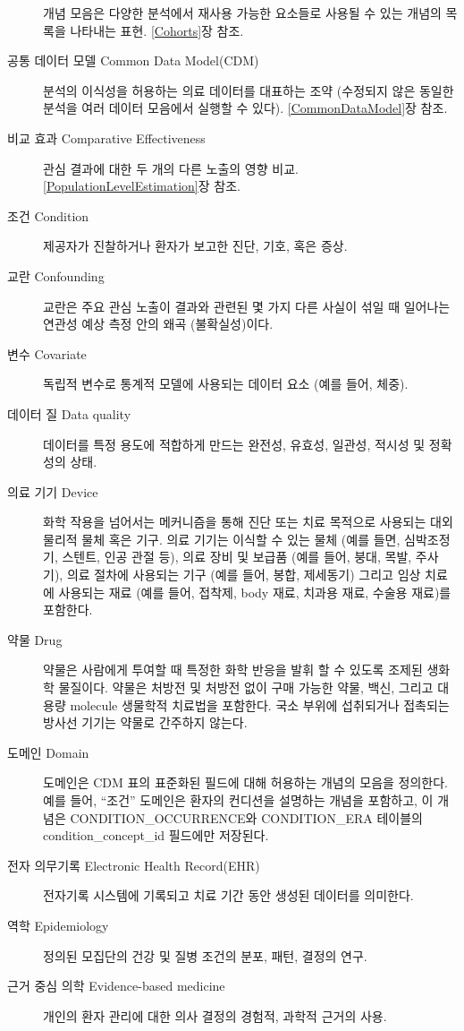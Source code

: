 \documentclass[10.5pt]{book}
\theoremstyle{definition}
\theoremstyle{definition}
\theoremstyle{definition}
\theoremstyle{remark}
\begin{document}
\begin{description}
개념 모음은 다양한 분석에서 재사용 가능한 요소들로 사용될 수 있는 개념의
목록을 나타내는 표현. \ref{Cohorts}장 참조.
\item[공통 데이터 모델 Common Data Model(CDM)]
분석의 이식성을 허용하는 의료 데이터를 대표하는 조약 (수정되지 않은
동일한 분석을 여러 데이터 모음에서 실행할 수 있다).
\ref{CommonDataModel}장 참조.
\item[비교 효과 Comparative Effectiveness]
관심 결과에 대한 두 개의 다른 노출의 영향 비교.
\ref{PopulationLevelEstimation}장 참조.
\item[조건 Condition]
제공자가 진찰하거나 환자가 보고한 진단, 기호, 혹은 증상.
\item[교란 Confounding]
교란은 주요 관심 노출이 결과와 관련된 몇 가지 다른 사실이 섞일 때
일어나는 연관성 예상 측정 안의 왜곡 (불확실성)이다.
\item[변수 Covariate]
독립적 변수로 통계적 모델에 사용되는 데이터 요소 (예를 들어, 체중).
\item[데이터 질 Data quality]
데이터를 특정 용도에 적합하게 만드는 완전성, 유효성, 일관성, 적시성 및
정확성의 상태.
\item[의료 기기 Device]
화학 작용을 넘어서는 메커니즘을 통해 진단 또는 치료 목적으로 사용되는
대외 물리적 물체 혹은 기구. 의료 기기는 이식할 수 있는 물체 (예를 들면,
심박조정기, 스텐트, 인공 관절 등), 의료 장비 및 보급품 (예를 들어, 붕대,
목발, 주사기), 의료 절차에 사용되는 기구 (예를 들어, 봉합, 제세동기)
그리고 임상 치료에 사용되는 재료 (예를 들어, 접착제, body 재료, 치과용
재료, 수술용 재료)를 포함한다.
\item[약물 Drug]
약물은 사람에게 투여할 때 특정한 화학 반응을 발휘 할 수 있도록 조제된
생화학 물질이다. 약물은 처방전 및 처방전 없이 구매 가능한 약물, 백신,
그리고 대용량 molecule 생물학적 치료법을 포함한다. 국소 부위에
섭취되거나 접촉되는 방사선 기기는 약물로 간주하지 않는다.
\item[도메인 Domain]
도메인은 CDM 표의 표준화된 필드에 대해 허용하는 개념의 모음을 정의한다.
예를 들어, ``조건'' 도메인은 환자의 컨디션을 설명하는 개념을 포함하고,
이 개념은 CONDITION\_OCCURRENCE와 CONDITION\_ERA 테이블의
condition\_concept\_id 필드에만 저장된다.
\item[전자 의무기록 Electronic Health Record(EHR)]
전자기록 시스템에 기록되고 치료 기간 동안 생성된 데이터를 의미한다.
\item[역학 Epidemiology]
정의된 모집단의 건강 및 질병 조건의 분포, 패턴, 결정의 연구.
\item[근거 중심 의학 Evidence-based medicine]
개인의 환자 관리에 대한 의사 결정의 경험적, 과학적 근거의 사용.

\end{description}
\end{document}
